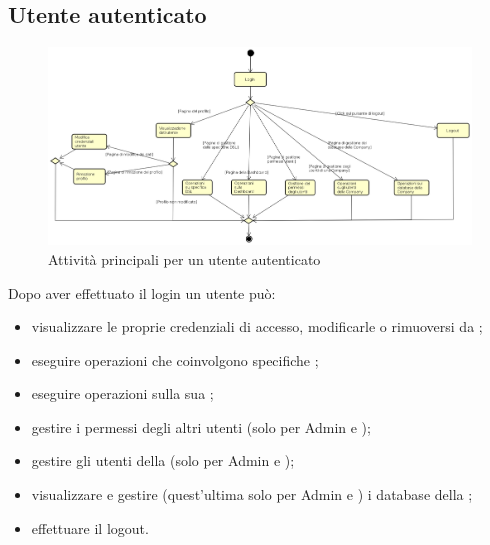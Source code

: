 \subsection{Utente autenticato}
\begin{figure}[H]
\begin{center}
\includegraphics[width=15cm]{res/sections/backend/activities/principaliConAuth.png}
\caption{Attività principali per un utente autenticato}
\end{center}
\end{figure}
Dopo aver effettuato il login un utente può:
\begin{itemize}
\item visualizzare le proprie credenziali di accesso, modificarle o rimuoversi da ;
\item eseguire operazioni che coinvolgono specifiche ;
\item eseguire operazioni sulla sua ;
\item gestire i permessi degli altri utenti (solo per Admin e );
\item gestire gli utenti della  (solo per Admin e );
\item visualizzare e gestire (quest'ultima solo per Admin e ) i database della ;
\item effettuare il logout.
\end{itemize}
